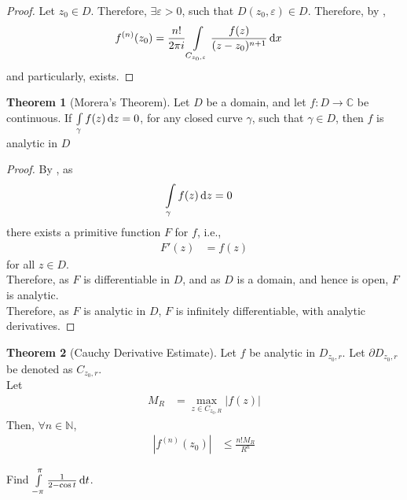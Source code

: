\documentclass[titlepage, fleqn, a4paper, 12pt, twoside]{article}
\theoremstyle{definition}
\theoremstyle{theorem}
\newtheorem{theorem}{Theorem}
\begin{document}
\begin{proof}
	Let $z_0 \in D$.
	Therefore, $\exists \varepsilon > 0$, such that $D(z_0,\varepsilon) \in D$.
	Therefore, by ,
	\begin{align*}
		f^{(n)}(z_0) & = \frac{n!}{2 \pi i} \int\limits_{C_{z_0,\varepsilon}} \frac{f(z)}{(z - z_0)^{n + 1}} \dif x
	\end{align*}
	and particularly, exists.
\end{proof}

\begin{theorem}[Morera's Theorem]
	Let $D$ be a domain, and let $f : D \to \mathbb{C}$ be continuous.
	If $\int\limits_{\gamma} f(z) \dif z = 0$, for any closed curve $\gamma$, such that $\gamma \in D$, then $f$ is analytic in $D$
	\label{thm:Morera's_Theorem}
\end{theorem}

\begin{proof}
	By , as
	\begin{align*}
		\int\limits_{\gamma} f(z) \dif z & = 0
	\end{align*}
	there exists a primitive function $F$ for $f$, i.e.,
	\begin{align*}
		F'(z) & = f(z)
	\end{align*}
	for all $z \in D$.\\
	Therefore, as $F$ is differentiable in $D$, and as $D$ is a domain, and hence is open, $F$ is analytic.\\
	Therefore, as $F$ is analytic in $D$, $F$ is infinitely differentiable, with analytic derivatives.
\end{proof}

\begin{theorem}[Cauchy Derivative Estimate]
	Let $f$ be analytic in $D_{z_0,r}$.
	Let $\partial D_{z_0,r}$ be denoted as $C_{z_0,r}$.\\
	Let
	\begin{align*}
		M_R & = \max\limits_{z \in C_{z_0,R}}\left| f(z) \right|
	\end{align*}
	Then, $\forall n \in \mathbb{N}$,
	\begin{align*}
		\left| f^{(n)}(z_0) \right| & \le \frac{n! M_R}{R^n}
	\end{align*}
	\label{thm:Cauchy_Derivative_Estimate}
\end{theorem}

\begin{question}
	Find $\int\limits_{-\pi}^{\pi} \frac{1}{2 - \cos t} \dif t$.
\end{question}
\end{document}
